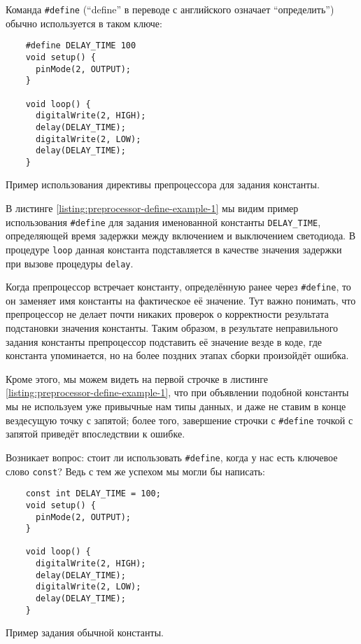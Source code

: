 \documentclass[../sparc.tex]{subfiles}
\begin{document}
Команда \texttt{#define} (``define'' в переводе с английского означает
``определить'') обычно используется в таком ключе:

\begin{listing}[H]
  \begin{verbatim}
    #define DELAY_TIME 100
    void setup() {
      pinMode(2, OUTPUT);
    }

    void loop() {
      digitalWrite(2, HIGH);
      delay(DELAY_TIME);
      digitalWrite(2, LOW);
      delay(DELAY_TIME);
    }
  \end{verbatim}
  \label{listing:preprocessor-define-example-1}
  \caption{Пример использования директивы препроцессора для задания константы.}
\end{listing}

В листинге \ref{listing:preprocessor-define-example-1} мы видим пример
использования \texttt{#define} для задания именованной константы
\texttt{DELAY_TIME}, определяющей время задержки между включением и
выключением светодиода.  В процедуре \texttt{loop} данная константа
подставляется в качестве значения задержки при вызове процедуры
\texttt{delay}.

Когда препроцессор встречает константу, определённую ранее через
\texttt{#define}, то он заменяет имя константы на фактическое её
значение.  Тут важно понимать, что препроцессор не делает почти никаких проверок
о корректности результата подстановки значения константы.  Таким образом, в
результате неправильного задания константы препроцессор подставить её значение
везде в коде, где константа упоминается, но на более поздних этапах сборки
произойдёт ошибка.

Кроме этого, мы можем видеть на первой строчке в листинге
\ref{listing:preprocessor-define-example-1}, что при объявлении подобной константы
мы не используем уже привычные нам типы данных, и даже не ставим в конце
вездесущую точку с запятой; более того, завершение строчки с
\texttt{#define} точкой с запятой приведёт впоследствии к ошибке.

Возникает вопрос: стоит ли использовать \texttt{#define}, когда у нас
есть ключевое слово \texttt{const}?  Ведь с тем же успехом мы могли бы
написать:

\begin{listing}[H]
  \begin{verbatim}
    const int DELAY_TIME = 100;
    void setup() {
      pinMode(2, OUTPUT);
    }

    void loop() {
      digitalWrite(2, HIGH);
      delay(DELAY_TIME);
      digitalWrite(2, LOW);
      delay(DELAY_TIME);
    }
  \end{verbatim}
  \label{listing:preprocessor-define-example-2}
  \caption{Пример задания обычной константы.}
\end{listing}
\end{document}
